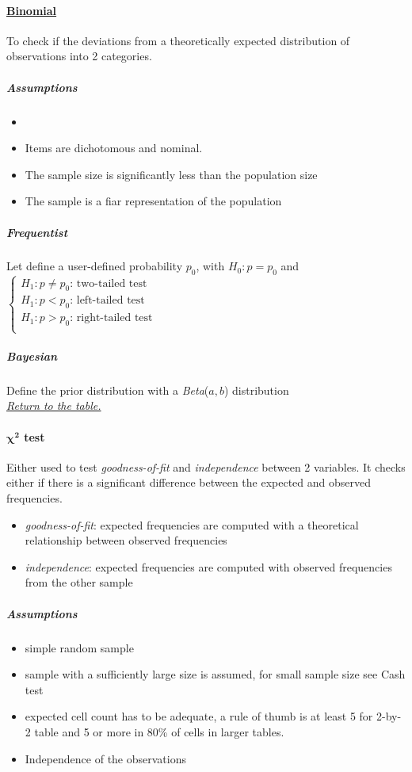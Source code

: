 \paragraph{\hyperref[binomial_test]{Binomial}}
To check if the deviations from a theoretically expected distribution of observations into
2 categories.\\

\subparagraph{Assumptions}
\begin{itemize}
    \item {}
    \item Items are dichotomous and nominal.
    \item The sample size is significantly less than the population size
    \item The sample is a fiar representation of the population
\end{itemize}


\subparagraph{Frequentist}
Let define a user-defined probability $p_{0}$, with $H_{0}: p = p_{0}$ and
$\begin{cases}
    H_{1}: p \neq p_{0}\text{: two-tailed test} \\
    H_{1}: p < p_{0}\text{: left-tailed test} \\
    H_{1}: p > p_{0}\text{: right-tailed test} \\
     
\end{cases}$

\subparagraph{Bayesian}
Define the prior distribution with a \emph{Beta}($a,b$) distribution\\

\textit{\hyperref[statistical_method_table]{Return to the table.}}


\paragraph{$\bm{\chi^{2}}$ test}
Either used to test \emph{goodness-of-fit} and \emph{independence} between 2 variables.
It checks either if there is a significant difference between the expected and observed 
frequencies.
\begin{itemize}
    \item \emph{goodness-of-fit}: expected frequencies are computed with a theoretical 
        relationship between observed frequencies
    \item \emph{independence}: expected frequencies are computed with observed frequencies
        from the other sample
\end{itemize}
\subparagraph{Assumptions}
\begin{itemize}
    \item simple random sample
    \item sample with a sufficiently large size is assumed, for small sample size see Cash test
    \item expected cell count has to be adequate, a rule of thumb is at least 5 for 2-by-2
        table and 5 or more in 80\% of cells in larger tables.
    \item Independence of the observations
\end{itemize}

